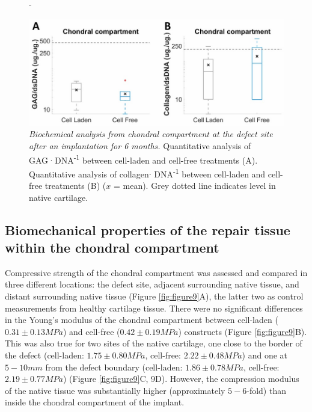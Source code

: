 \documentclass[twocolumn, empirical, authordate, issue]{jote-new-article}
\begin{document}
\begin{figure}[h!]
\begin{adjustwidth}{-\fullwidthlen}{}

\includegraphics[width=\columnwidth+\fullwidthlen]{media/image8.jpg}
\caption{\emph{Biochemical analysis from chondral compartment at the defect site after an implantation for 6 months.} Quantitative analysis of GAG·DNA\textsuperscript{-1} between cell-laden and cell-free treatments (A). Quantitative analysis of collagen$\cdot$ DNA\textsuperscript{-1} between cell-laden and cell-free treatments (B) ($x$ = mean). Grey dotted line indicates level in native cartilage.}
\label{fig:figure8}
\end{adjustwidth}
\end{figure}

\subsection{Biomechanical properties of the repair tissue within the chondral compartment} 

Compressive strength of the chondral compartment was assessed and compared in three different locations: the defect site, adjacent surrounding native tissue, and distant surrounding native tissue (Figure \ref{fig:figure9}A), the latter two as control measurements from healthy cartilage tissue. There were no significant differences in the Young's modulus of the chondral compartment between cell-laden ($0.31 \pm 0.13 MPa$) and cell-free ($0.42 \pm 0.19 MPa$) constructs (Figure \ref{fig:figure9}B). This was also true for two sites of the native cartilage, one close to the border of the defect (cell-laden: $1.75 \pm 0.80 MPa$, cell-free: $2.22 \pm 0.48 MPa$) and one at $5 - 10 mm$ from the defect boundary (cell-laden: $1.86 \pm 0.78 MPa$, cell-free: $2.19 \pm 0.77 MPa$) (Figure \ref{fig:figure9}C, 9D). However, the compression modulus of the native tissue was substantially higher (approximately $5-6$-fold) than inside the chondral compartment of the implant.
\end{document}
